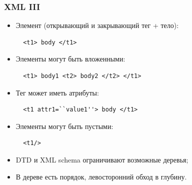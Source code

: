 \documentclass{beamer}
\begin{document}

\begin{frame}[fragile]
\frametitle{XML III}

\lstset{language=XML}   

\begin{itemize}
  \item Элемент (открывающий и закрывающий тег + тело):
  \begin{lstlisting}
  <t1> body </t1>\end{lstlisting}  
  \item Элементы могут быть вложенными:
  \begin{lstlisting}
  <t1> body1 <t2> body2 </t2> </t1>\end{lstlisting}    
  \item Тег может иметь атрибуты:
  \begin{lstlisting}
  <t1 attr1=``value1''> body </t1>\end{lstlisting}    
  \item Элементы могут быть пустыми:
  \begin{lstlisting}  
  <t1/>\end{lstlisting}      
  \item DTD и XML schema ограничивают возможные деревья;
  \item В дереве есть порядок, левосторонний обход в глубину.
\end{itemize}
\end{frame}
\end{document}
